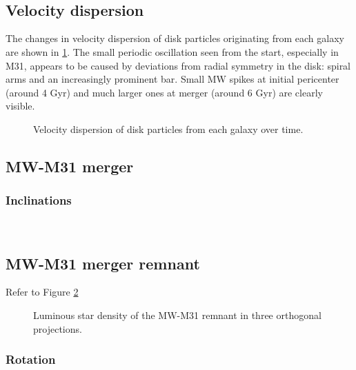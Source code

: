 \documentclass[twocolumn]{aastex63}
\newcommand{\todo}{\color{red}{TODO}\color{black}\hspace{2mm}}
\begin{document}
\todo{identify, trace history, trace fate}\ 

\todo{Jacobi radius}\ 

\subsection{Velocity dispersion}

The changes in velocity dispersion of disk particles originating from each galaxy are shown in \ref{fig:vel_disp}. The small periodic oscillation seen from the start, especially in M31, appears to be caused by deviations from radial symmetry in the disk: spiral arms and an increasingly prominent bar. Small MW spikes at initial pericenter (around 4 Gyr) and much larger ones at merger (around 6 Gyr) are clearly visible.

\begin{figure}[htb!]
	\caption{Velocity dispersion of disk particles from each galaxy over time.
	\label{fig:vel_disp}}
\end{figure}

\subsection{MW-M31 merger}

\subsubsection{Inclinations}

\todo{Relative rotation axes of disks}\ 


\subsection{MW-M31 merger remnant}

\todo{shape - how to get principal axes? boxiness?}

Refer to Figure \ref{fig:rem_shape}

\begin{figure}[htb!]
	\caption{Luminous star density of the MW-M31 remnant in three orthogonal projections.
	\label{fig:rem_shape}}
\end{figure}


\subsubsection{Rotation}

\todo{phase diagram}
\end{document}
